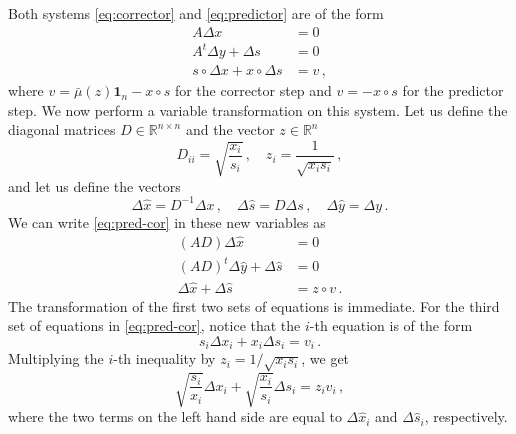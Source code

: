 \documentclass[12pt, showidx, twoside]{article}
\def\R{\mathbb{R}}
\def\gap{\bar{\mu}}
\def\bo{\mathbf{1}}
\begin{document}
{{{Both systems \eqref{eq:corrector} and \eqref{eq:predictor} are of the form
\begin{equation}\label{eq:pred-cor}
\begin{aligned}
A\Delta x&=0\\
A^t \Delta y+\Delta s&=0\\
s\circ \Delta x+x\circ \Delta s&=v\, ,
\end{aligned}
\end{equation} 
where $v=\gap(z)\bo_n-x\circ s$ for the corrector step and $v=-x\circ s$ for the predictor step. 
We now perform a variable transformation on this system. 
Let us define the diagonal matrices $D\in\R^{n\times n}$ and the vector $z\in\R^n$
\[
    D_{ii}=\sqrt{\frac{x_i}{s_i}}\, , \quad z_{i}=\frac{1}{\sqrt{x_is_i}}\, ,
\]
and let us define the vectors
\[
   {\Delta \hat x}=D^{-1}\Delta x\, ,\quad {\Delta \hat s}=D\Delta s\, ,\quad \Delta \hat y=\Delta y\, .
\]
We can write \eqref{eq:pred-cor} in these new variables as 
\begin{equation}\label{eq:pred-cor-scaled}
\begin{aligned}
(AD)\Delta \hat x&=0\\
(AD)^t \Delta \hat y+\Delta \hat s&=0\\
 \Delta \hat x+\Delta \hat s&=z\circ v\, .
\end{aligned}
\end{equation} 
The transformation of the first two sets of equations is immediate. For the third set of equations in \eqref{eq:pred-cor}, notice that the $i$-th equation is of the form
\[
    s_i \Delta x_i +x_i \Delta s_i =v_i\, .
\]
Multiplying the $i$-th inequality by $z_i=1/\sqrt{x_is_i}$, we get
\[
    \sqrt{\frac{s_i}{x_i}}\Delta x_i + \sqrt{\frac{x_i}{s_i}}\Delta s_i = z_iv_i\, ,
\]
where the two terms on the left hand side are equal to $\Delta \hat x_i$ and $\Delta \hat s_i$, respectively. 

}}}
\end{document}
